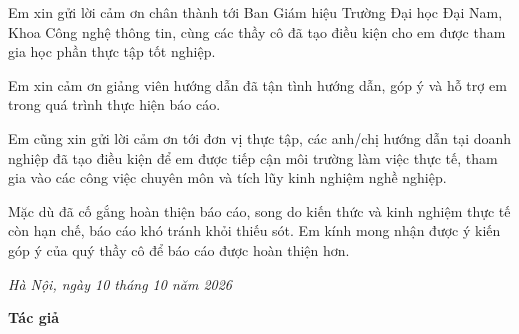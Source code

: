 
Em xin gửi lời cảm ơn chân thành tới Ban Giám hiệu Trường Đại học Đại Nam, Khoa Công nghệ thông tin, cùng các thầy cô đã tạo điều kiện cho em được tham gia học phần thực tập tốt nghiệp.

Em xin cảm ơn giảng viên hướng dẫn \GiangVienHD{} đã tận tình hướng dẫn, góp ý và hỗ trợ em trong quá trình thực hiện báo cáo.

Em cũng xin gửi lời cảm ơn tới đơn vị thực tập, các anh/chị hướng dẫn tại doanh nghiệp đã tạo điều kiện để em được tiếp cận môi trường làm việc thực tế, tham gia vào các công việc chuyên môn và tích lũy kinh nghiệm nghề nghiệp.

Mặc dù đã cố gắng hoàn thiện báo cáo, song do kiến thức và kinh nghiệm thực tế còn hạn chế, báo cáo khó tránh khỏi thiếu sót. Em kính mong nhận được ý kiến góp ý của quý thầy cô để báo cáo được hoàn thiện hơn.

\vspace{1cm}

\begin{flushright}
\begin{minipage}{8cm}
\centering
\textit{Hà Nội, ngày 10 tháng 10 năm 2026}

\vspace{0.5cm}

\textbf{Tác giả}

\vspace{2cm}

\textbf{\TenSinhVien}
\end{minipage}
\end{flushright}
